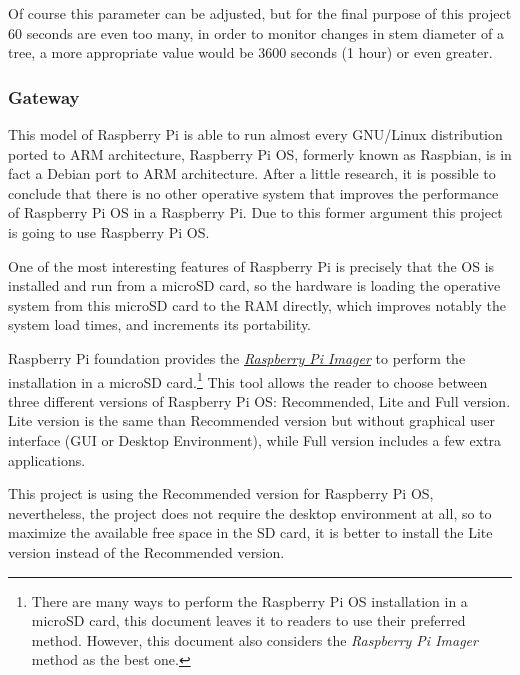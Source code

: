 \documentclass[11pt,a4paper,dvipsnames,twoside]{article}
\newcounter{subsubsubsection}[subsubsection]
\begin{document}
Of course this parameter can be adjusted, but for the final purpose of this project 60 seconds are even too many, in order to monitor changes in stem diameter of a tree, a more appropriate value would be 3600 seconds (1 hour) or even greater.  

\subsubsection{Gateway}\label{sssec:Gateway}

This model of Raspberry Pi is able to run almost every GNU/Linux distribution ported to ARM architecture, Raspberry Pi OS, formerly known as Raspbian, \cite{RaspberryPiOs} is in fact a Debian port to ARM architecture. After a little research, it is possible to conclude that there is no other operative system that improves the performance of Raspberry Pi OS in a Raspberry Pi. Due to this former argument this project is going to use Raspberry Pi OS.

One of the most interesting features of Raspberry Pi is precisely that the OS is installed and run from a microSD card, so the hardware is loading the operative system from this microSD card to the RAM directly, which improves notably the system load times, and increments its portability.

Raspberry Pi foundation provides the \href{https://www.raspberrypi.org/downloads/noobs/}{\textit{Raspberry Pi Imager}} to perform the installation in a microSD card.\footnote{There are many ways to perform the Raspberry Pi OS installation in a microSD card, this document leaves it to readers to use their preferred method. However, this document also considers the \textit{Raspberry Pi Imager} method as the best one.} This tool allows the reader to choose between three different versions of Raspberry Pi OS: Recommended, Lite and Full version. Lite version is the same than Recommended version but without graphical user interface (GUI or Desktop Environment), while Full version includes a few extra applications.

This project is using the Recommended version for Raspberry Pi OS, nevertheless, the project does not require the desktop environment at all, so to maximize the available free space in the SD card, it is better to install the Lite version instead of the Recommended version.
\end{document}
